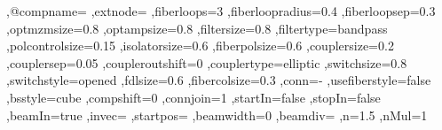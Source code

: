 {%
        ,@compname=\@empty
        ,extnode=\@empty
        ,fiberloops=3
        ,fiberloopradius=0.4
        ,fiberloopsep=0.3
        ,optmzmsize=0.8
        ,optampsize=0.8
        ,filtersize=0.8
        ,filtertype=bandpass
        ,polcontrolsize=0.15
        ,isolatorsize=0.6
        ,fiberpolsize=0.6
        ,couplersize=0.2
        ,couplersep=0.05
        ,coupleroutshift=0
        ,couplertype=elliptic
        ,switchsize=0.8
        ,switchstyle=opened
        ,fdlsize=0.6
        ,fibercolsize=0.3
        ,conn=-
        ,usefiberstyle=false
        ,bsstyle=cube
        ,compshift=0
        ,connjoin=1
        ,startIn=false
        ,stopIn=false
        ,beamIn=true
        ,invec=\@empty
        ,startpos=\@empty
        ,beamwidth=0
        ,beamdiv=\@empty
        ,n=1.5
        ,nMul=1
}%
%
%
%
\def\pst@draw@component#1#2{%
    \def\@@comp{%
       #2
       \ifx\POK@extnode\@empty\else
          \pnode(! \pst@optexpdict ExtNode end){\POK@extnode@name}
       \fi
    }%
    \ifPOE@endbox%
       \ifx\POK@label@offset\@empty
          \psset{labeloffset=0}
       \fi
       \psset{position=1}%
    \fi%
    \ncline[linestyle=none,fillstyle=none,npos=]{\optexp@nodeA}{\optexp@nodeB}%
    \begingroup
    \psset{style=OptComp}
    \ifPOE@component@optional
      \psset{style=OptionalStyle}%
    \fi
    \ifx\POK@position\@empty
        \ifx\POK@abspos\@empty
           \ncput[nrot=:U,npos=]{\put@Comp{\@@comp}}
        \else
           \nlput[nrot=:U](\optexp@nodeA)(\optexp@nodeB){\POK@abspos}{\put@Comp{\@@comp}}
        \fi
    \else
       \ncput[nrot=:U,npos=\POK@position]{\put@Comp{\@@comp}}
    \fi
    \endgroup
    \ifPOE@label@innerlabel
       \ifdim\optboxwidth>0pt
          \psset{labeloffset=0, labelref=relative}
          \put@Label{\parbox{\optboxwidth}{#1}}%
       \else
          \put@Label{#1}%
       \fi
    \else
       \put@Label{#1}%
    \fi
    \ifPOE@debug@showoptdots
        \psdot[linecolor=red](\optexp@nodeLabel)
        \psdot[linecolor=red](\optexp@nodeLabelShifted)
        \psdot[linecolor=black](\optexp@nodeA)
        \psdot[linecolor=black](\optexp@nodeB)
    \fi
\ignorespaces}%

